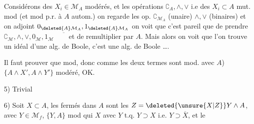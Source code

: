 Considérons des $X_i\in \mathcal M_A$  modérés, et les opérations $\complement_A,\wedge,\vee$  i.e des $X_i\subset A$ mut. mod (et mod p.r. à $A$ autom.) on regarde les op.
  $\complement_{\mathcal M_A}$ (unaire) $\wedge,\vee$ (binaires) et on adjoint $0_{\deleted{A}\mathcal M_A},1_{\deleted{A}\mathcal M_A}$\unsure{)|,} on voit que c'est pareil que
 de prendre $\complement_{\mathcal M},\wedge,\vee,0_{\mathcal M},1_{\mathcal M}\quad\overline{\phantom X}$ et de remultiplier par $A$. Mais
alors on voit que l'on trouve un idéal d'une alg. de Boole, c'est une alg. de Boole \ldots.

 Il faut prouver que
mod, donc comme  les deux termes sont mod. avec $A$) $\{A\wedge X',A\wedge Y'\}$ modéré, OK.

5) Trivial

6) Soit $X\subset A$, les fermés dans $A$ sont les $Z=\deleted{\unsure{X|Z}}Y\wedge A$, avec $Y\in \mathcal M_f$, $\{Y,A\}$ mod   qui  $X$   avec $Y$ t.q. $Y\supset X$ i.e. $Y\supset\overline X$, et le
